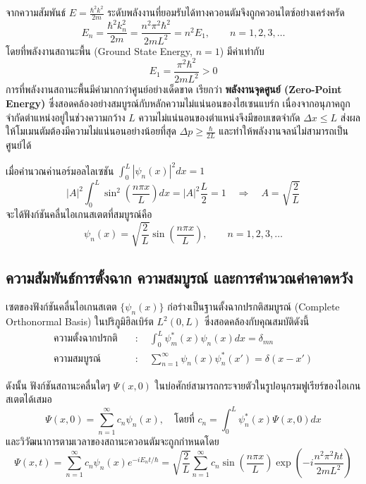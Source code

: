 จากความสัมพันธ์ $E = \frac{\hbar^2 k^2}{2m}$ ระดับพลังงานที่ยอมรับได้ทางควอนตัมจึงถูกควอนไตซ์อย่างเคร่งครัด
\begin{equation}
E_n = \frac{\hbar^2 k_n^2}{2m} = \frac{n^2 \pi^2 \hbar^2}{2mL^2} = n^2 E_1, \qquad n = 1, 2, 3, \dots
\end{equation}
โดยที่พลังงานสถานะพื้น (Ground State Energy, $n=1$) มีค่าเท่ากับ
\begin{equation}
E_1 = \frac{\pi^2 \hbar^2}{2mL^2} > 0
\end{equation}
การที่พลังงานสถานะพื้นมีค่ามากกว่าศูนย์อย่างเด็ดขาด เรียกว่า \textbf{พลังงานจุดศูนย์ (Zero-Point Energy)} ซึ่งสอดคล้องอย่างสมบูรณ์กับหลักความไม่แน่นอนของไฮเซนแบร์ก เนื่องจากอนุภาคถูกจำกัดตำแหน่งอยู่ในช่วงความกว้าง $L$ ความไม่แน่นอนของตำแหน่งจึงมีขอบเขตจำกัด $\Delta x \le L$ ส่งผลให้โมเมนตัมต้องมีความไม่แน่นอนอย่างน้อยที่สุด $\Delta p \ge \frac{\hbar}{2L}$ และทำให้พลังงานจลน์ไม่สามารถเป็นศูนย์ได้

เมื่อคำนวณค่านอร์มอลไลเซชัน $\int_0^L |\psi_n(x)|^2 dx = 1$
\begin{equation}
|A|^2 \int_0^L \sin^2\left(\frac{n\pi x}{L}\right) dx = |A|^2 \frac{L}{2} = 1 \quad \Longrightarrow \quad A = \sqrt{\frac{2}{L}}
\end{equation}
จะได้ฟังก์ชันคลื่นไอเกนสเตตที่สมบูรณ์คือ
\begin{equation}
\psi_n(x) = \sqrt{\frac{2}{L}} \sin\left(\frac{n\pi x}{L}\right), \qquad n = 1, 2, 3, \dots
\end{equation}

\subsection{ความสัมพันธ์การตั้งฉาก ความสมบูรณ์ และการคำนวณค่าคาดหวัง}
เซตของฟังก์ชันคลื่นไอเกนสเตต $\{\psi_n(x)\}$ ก่อร่างเป็นฐานตั้งฉากปรกติสมบูรณ์ (Complete Orthonormal Basis) ในปริภูมิฮิลเบิร์ต $L^2(0, L)$ ซึ่งสอดคล้องกับคุณสมบัติดังนี้
\begin{align}
\text{ความตั้งฉากปรกติ} \quad &\colon \quad \int_0^L \psi_m^*(x)\psi_n(x) dx = \delta_{mn} \\
\text{ความสมบูรณ์} \quad &\colon \quad \sum_{n=1}^\infty \psi_n(x)\psi_n^*(x') = \delta(x - x')
\end{align}

ดังนั้น ฟังก์ชันสถานะคลื่นใดๆ $\Psi(x, 0)$ ในบ่อศักย์สามารถกระจายตัวในรูปอนุกรมฟูเรียร์ของไอเกนสเตตได้เสมอ
\begin{equation}
\Psi(x, 0) = \sum_{n=1}^\infty c_n \psi_n(x), \quad \text{โดยที่ } c_n = \int_0^L \psi_n^*(x)\Psi(x, 0) dx
\end{equation}
และวิวัฒนาการตามเวลาของสถานะควอนตัมจะถูกกำหนดโดย
\begin{equation}
\Psi(x, t) = \sum_{n=1}^\infty c_n \psi_n(x) e^{-iE_n t/\hbar} = \sqrt{\frac{2}{L}} \sum_{n=1}^\infty c_n \sin\left(\frac{n\pi x}{L}\right) \exp\left( -i \frac{n^2 \pi^2 \hbar t}{2mL^2} \right)
\end{equation}

